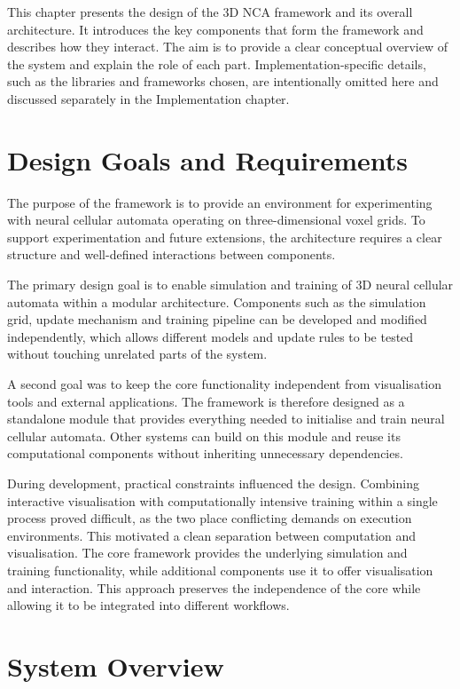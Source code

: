 This chapter presents the design of the 3D NCA framework and its overall
architecture. It introduces the key components that form the framework and
describes how they interact. The aim is to provide a clear conceptual overview
of the system and explain the role of each part. Implementation-specific
details, such as the libraries and frameworks chosen, are intentionally omitted
here and discussed separately in the Implementation chapter.

\section{Design Goals and Requirements}

The purpose of the framework is to provide an environment for experimenting
with neural cellular automata operating on three-dimensional voxel grids. To
support experimentation and future extensions, the architecture requires a clear
structure and well-defined interactions between components.

The primary design goal is to enable simulation and training of 3D neural
cellular automata within a modular architecture. Components such as the
simulation grid, update mechanism and training pipeline can be developed and
modified independently, which allows different models and update rules to be
tested without touching unrelated parts of the system.

A second goal was to keep the core functionality independent from
visualisation tools and external applications. The framework is therefore
designed as a standalone module that provides everything needed to initialise
and train neural cellular automata. Other systems can build on this module and
reuse its computational components without inheriting unnecessary dependencies.

During development, practical constraints influenced the design. Combining
interactive visualisation with computationally intensive training within a
single process proved difficult, as the two place conflicting demands on
execution environments. This motivated a clean separation between computation
and visualisation. The core framework provides the underlying simulation and
training functionality, while additional components use it to offer
visualisation and interaction. This approach preserves the independence of the
core while allowing it to be integrated into different workflows.

\section{System Overview}

